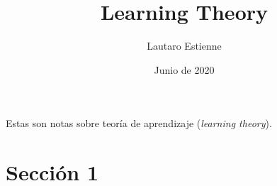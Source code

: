 \documentclass[12pt]{article}
\title{Learning Theory}
\author{Lautaro Estienne}
\date{Junio de 2020}
\begin{document}
\maketitle

Estas son notas sobre teoría de aprendizaje (\textit{learning theory}). 

\section{Sección 1}

\end{document}

